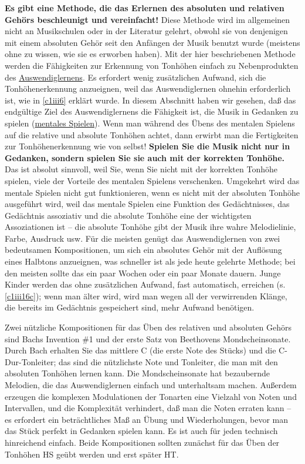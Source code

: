 \textbf{Es gibt eine Methode, die das Erlernen des absoluten und relativen Gehörs beschleunigt und vereinfacht!}
Diese Methode wird im allgemeinen nicht an Musikschulen oder in der Literatur gelehrt, obwohl sie von denjenigen mit einem absoluten Gehör seit den Anfängen der Musik benutzt wurde (meistens ohne zu wissen, wie sie es erworben haben).
Mit der hier beschriebenen Methode werden die Fähigkeiten zur Erkennung von Tonhöhen einfach zu Nebenprodukten des \hyperref[c1iii6]{Auswendiglernens}.
Es erfordert wenig zusätzlichen Aufwand, sich die Tonhöhenerkennung anzueignen, weil das Auswendiglernen ohnehin erforderlich ist, wie in \autoref{c1iii6} erklärt wurde.
In diesem Abschnitt haben wir gesehen, daß das endgültige Ziel des Auswendiglernens die Fähigkeit ist, die Musik in Gedanken zu spielen (\hyperref[c1iii6tastatur]{mentales Spielen}).
Wenn man während des Übens des mentalen Spielens auf die relative und absolute Tonhöhen achtet, dann erwirbt man die Fertigkeiten zur Tonhöhenerkennung wie von selbst!
\textbf{Spielen Sie die Musik nicht nur in Gedanken, sondern spielen Sie sie auch mit der korrekten Tonhöhe.}
Das ist absolut sinnvoll, weil Sie, wenn Sie nicht mit der korrekten Tonhöhe spielen, viele der Vorteile des mentalen Spielens verschenken.
Umgekehrt wird das mentale Spielen nicht gut funktionieren, wenn es nicht mit der absoluten Tonhöhe ausgeführt wird, weil das mentale Spielen eine Funktion des Gedächtnisses, das Gedächtnis assoziativ und die absolute Tonhöhe eine der wichtigsten Assoziationen ist -- die absolute Tonhöhe gibt der Musik ihre wahre Melodielinie, Farbe, Ausdruck usw.
Für die meisten genügt das Auswendiglernen von zwei bedeutsamen Kompositionen, um sich ein absolutes Gehör mit der Auflösung eines Halbtons anzueignen, was schneller ist als jede heute gelehrte Methode; bei den meisten sollte das ein paar Wochen oder ein paar Monate dauern.
Junge Kinder werden das ohne zusätzlichen Aufwand, fast automatisch, erreichen (s. \hyperref[c1iii16c]{\autoref{c1iii16c}}); wenn man älter wird, wird man wegen all der verwirrenden Klänge, die bereits im Gedächtnis gespeichert sind, mehr Aufwand benötigen.

Zwei nützliche Kompositionen für das Üben des relativen und absoluten Gehörs sind Bachs Invention \#1 und der erste Satz von Beethovens Mondscheinsonate.
Durch Bach erhalten Sie das mittlere C (die erste Note des Stücks) und die C-Dur-Tonleiter; das sind die nützlichste Note und Tonleiter, die man mit den absoluten Tonhöhen lernen kann.
Die Mondscheinsonate hat bezaubernde Melodien, die das Auswendiglernen einfach und unterhaltsam machen.
Außerdem erzeugen die komplexen Modulationen der Tonarten eine Vielzahl von Noten und Intervallen, und die Komplexität verhindert, daß man die Noten erraten kann -- es erfordert ein beträchtliches Maß an Übung und Wiederholungen, bevor man das Stück perfekt in Gedanken spielen kann.
Es ist auch für jeden technisch hinreichend einfach.
Beide Kompositionen sollten zunächst für das Üben der Tonhöhen HS geübt werden und erst später HT.

